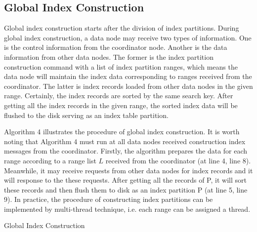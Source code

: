\vspace{-0.2cm}
\subsection{Global Index Construction}
Global index construction starts after the division of index partitions. During global index construction, a data node  may receive two types of information. One is the control information from the coordinator node. Another is the data information from other data nodes. The former is the index partition construction command with a list of index partition ranges, which means the data node will maintain the index data corresponding to ranges received from the coordinator.
The latter is index records loaded from other data nodes in the given range. Certainly, the index records are sorted by the same search key. After getting all the index records in the given range, the sorted index data will be flushed to the disk serving as an index table partition.

Algorithm 4 illustrates the procedure of  global index construction. It is worth noting that Algorithm 4 must run at all data nodes received construction index messages from the coordinator. Firstly, the algorithm  prepares the data for each range according to a range list $L$ received from the coordinator (at line 4, line 8). Meanwhile, it may receive requests from other data nodes for index records and it will response to the these requests. After getting all the records of P, it will sort these records and then flush them to disk as an index partition P (at line 5, line 9). In practice, the procedure of constructing index partitions can be implemented by multi-thread technique, i.e. each range can be assigned a thread.

\LinesNumbered
\vspace{-0.7cm}
\begin{algorithm}[!htb]
\SetAlgoLined
\caption{Global Index Construction}%
\end{algorithm}
\vspace{-0.7cm}

